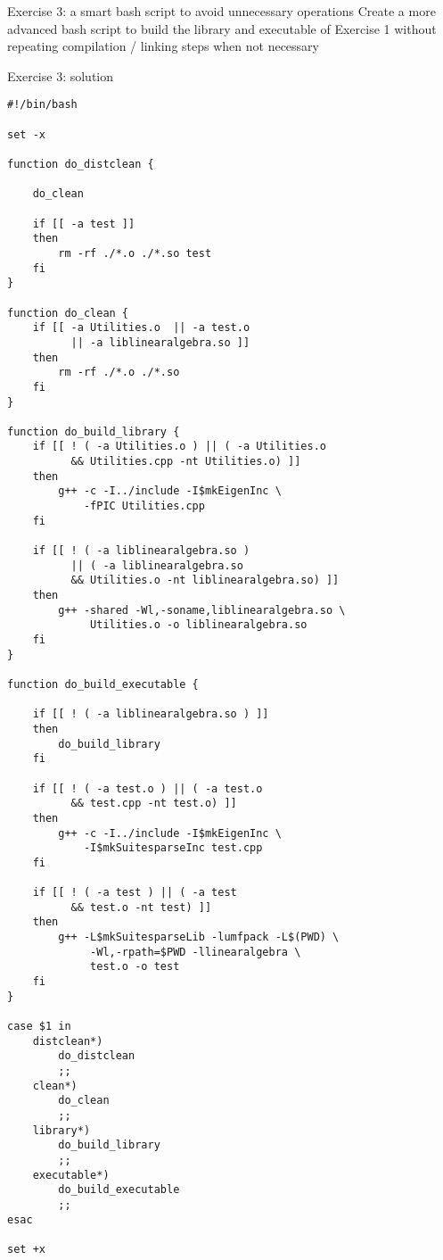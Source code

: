 \documentclass[10pt]{beamer}
\begin{document}
\begin{frame}{Exercise 3: a smart bash script to avoid unnecessary operations}
Create a more advanced bash script to build the library and executable of Exercise 1 without repeating compilation / linking steps when not necessary
\end{frame}

\begin{frame}{Exercise 3: solution}
\begin{verbatim}
#!/bin/bash

set -x

function do_distclean {

    do_clean

    if [[ -a test ]]
    then
        rm -rf ./*.o ./*.so test
    fi
}

function do_clean {
    if [[ -a Utilities.o  || -a test.o
          || -a liblinearalgebra.so ]]
    then
        rm -rf ./*.o ./*.so 
    fi
}

function do_build_library {
    if [[ ! ( -a Utilities.o ) || ( -a Utilities.o 
          && Utilities.cpp -nt Utilities.o) ]]
    then
        g++ -c -I../include -I$mkEigenInc \
            -fPIC Utilities.cpp
    fi

    if [[ ! ( -a liblinearalgebra.so )
          || ( -a liblinearalgebra.so
          && Utilities.o -nt liblinearalgebra.so) ]]
    then
        g++ -shared -Wl,-soname,liblinearalgebra.so \
             Utilities.o -o liblinearalgebra.so
    fi
}

function do_build_executable {

    if [[ ! ( -a liblinearalgebra.so ) ]]
    then
        do_build_library
    fi
       
    if [[ ! ( -a test.o ) || ( -a test.o
          && test.cpp -nt test.o) ]]
    then
        g++ -c -I../include -I$mkEigenInc \
            -I$mkSuitesparseInc test.cpp
    fi

    if [[ ! ( -a test ) || ( -a test
          && test.o -nt test) ]]
    then
        g++ -L$mkSuitesparseLib -lumfpack -L$(PWD) \
             -Wl,-rpath=$PWD -llinearalgebra \
             test.o -o test
    fi
}

case $1 in
    distclean*)        
        do_distclean
        ;;
    clean*)        
        do_clean
        ;;
    library*)
        do_build_library
        ;;
    executable*)
        do_build_executable
        ;;
esac

set +x
\end{verbatim}
\end{frame}
\end{document}

